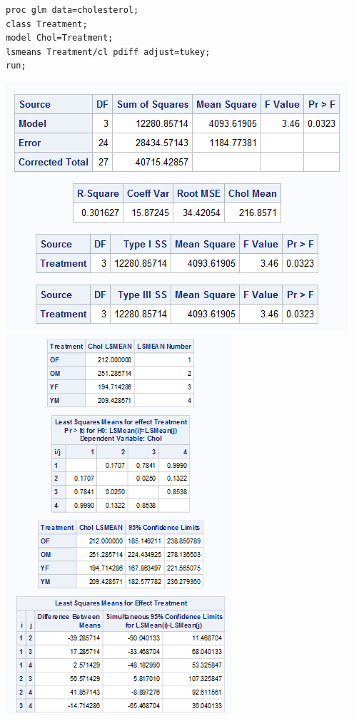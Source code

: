 \begin{small}
\begin{verbatim}
proc glm data=cholesterol;
class Treatment;
model Chol=Treatment;
lsmeans Treatment/cl pdiff adjust=tukey;
run;
\end{verbatim}
\end{small}

\begin{center}
\includegraphics[scale=0.65]{CholOneWay}\includegraphics[scale=0.8]{CholOneWay2}
\end{center}

